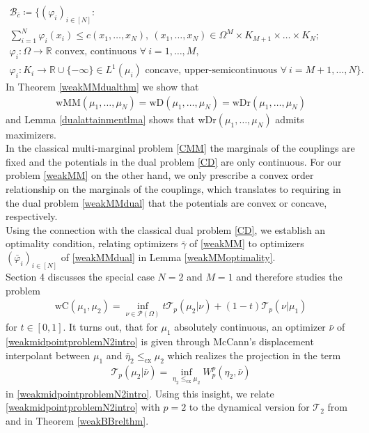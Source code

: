 \documentclass[10pt,a4paper]{amsart}
\newcommand{\RR}{\mathbb{R}}
\begin{document}
\begin{equation}\label{B_cset}
	\begin{gathered}
		\mathcal B_{\bar c}\coloneqq\Big\{(\varphi_i)_{i\in[N]}:\\
		\sum_{i=1}^N\varphi_i(x_i)\leq c(x_1,\dots,x_N),\ (x_1,\dots,x_N)\in\Omega^M\times K_{M+1}\times\dots\times K_N;\\ \varphi_i:\Omega\rightarrow\RR\text{ convex, continuous }\forall\ i=1,\dots,M,\\
		\varphi_i:K_i\rightarrow \RR\cup\{-\infty\}\in L^1(\mu_i)\text{ concave, upper-semicontinuous }\forall\ i=M+1,\dots,N\Big\}.
	\end{gathered}
\end{equation}
In Theorem \ref{weakMMdualthm} we show that
\begin{gather*}
	\text{wMM}(\mu_1,\dots,\mu_N)=\text{wD}(\mu_1,\dots,\mu_N)=\text{wDr}(\mu_1,\dots,\mu_N)
\end{gather*}
and Lemma \ref{dualattainmentlma} shows that $\text{wDr}(\mu_1,\dots,\mu_N)$ admits maximizers.\\
In the classical multi-marginal problem \eqref{CMM} the marginals of the couplings are fixed and the potentials in the dual problem \eqref{CD} are only continuous. For our problem \eqref{weakMM} on the other hand, we only prescribe a convex order relationship on the marginals of the couplings, which translates to requiring in the dual problem \eqref{weakMMdual} that the potentials are convex or concave, respectively.\\
Using the connection with the classical dual problem \eqref{CD}, we establish an optimality condition, relating optimizers $\bar\gamma$ of \eqref{weakMM} to optimizers $(\bar\varphi_i)_{i\in[N]}$ of \eqref{weakMMdual} in Lemma \ref{weakMMoptimality}.\\
Section 4 discusses the special case $N=2$ and $M=1$ and therefore studies the problem
\begin{gather}\label{weakmidpointproblemN2intro}
	\text{wC}(\mu_1,\mu_2)=\inf_{\nu\in\mathcal P(\Omega)}t\mathcal T_p(\mu_2|\nu)+(1-t)\mathcal T_p(\nu|\mu_1)
\end{gather}
for $t\in[0,1]$. It turns out, that for $\mu_1$ absolutely continuous, an optimizer $\bar\nu$ of \eqref{weakmidpointproblemN2intro} is given through McCann's displacement interpolant \cite{mccann1997} between $\mu_1$ and $\bar\eta_2\leq_{\text{cx}}\mu_2$ which realizes the projection in the term
\begin{gather*}
	\mathcal T_p(\mu_2|\bar\nu)=\inf_{\eta_2\leq_{\text{cx}}\mu_2}W_p^p(\eta_2,\bar\nu)
\end{gather*}
in \eqref{weakmidpointproblemN2intro}.
Using this insight, we relate \eqref{weakmidpointproblemN2intro} with $p=2$ to the dynamical version for $\mathcal T_2$ from \cite{gozlan2025} and \cite{guo2026} in Theorem \ref{weakBBrelthm}.
\end{document}
